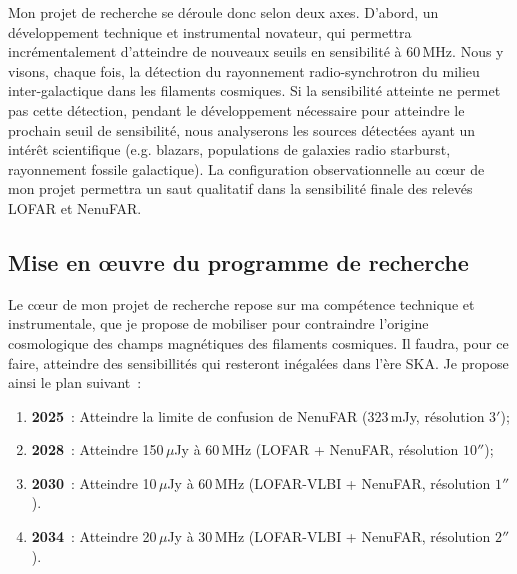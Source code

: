 Mon projet de recherche se d\'eroule donc selon deux axes. D'abord, un d\'eveloppement technique et instrumental novateur, qui permettra incr\'ementalement d'atteindre de nouveaux seuils en sensibilit\'e \`a 60\,MHz. Nous y visons, chaque fois, la d\'etection du rayonnement radio-synchrotron du milieu inter-galactique dans les filaments cosmiques. Si la sensibilit\'e atteinte ne permet pas cette d\'etection, pendant le d\'eveloppement n\'ecessaire pour atteindre le prochain seuil de sensibilit\'e, nous analyserons les sources d\'etect\'ees ayant un int\'er\^et scientifique (e.g. blazars, populations de galaxies radio starburst, rayonnement fossile galactique).
La configuration observationnelle au c{\oe}ur de mon projet permettra un saut qualitatif dans la sensibilit\'e finale des relev\'es LOFAR et NenuFAR.

\newpage

\subsection{Mise en {\oe}uvre du programme de recherche}

\pg
Le c{\oe}ur de mon projet de recherche repose sur ma comp\'etence technique et instrumentale, que je propose de mobiliser pour contraindre l'origine cosmologique des champs magn\'etiques des filaments cosmiques. 
Il faudra, pour ce faire, atteindre des sensibillit\'es qui resteront in\'egal\'ees dans l'\`ere SKA. Je propose ainsi le plan suivant~:

\begin{tcolorbox}[colback=green!10, colframe=green!50!black, arc=3mm, boxrule=1pt]
\begin{enumerate}
	\item \textbf{2025}~: Atteindre la limite de confusion de NenuFAR (323\,mJy, r\'esolution $3'$);
	\item \textbf{2028}~: Atteindre 150\,$\mu$Jy \`a 60\,MHz (LOFAR + NenuFAR, r\'esolution $10''$);
	\item \textbf{2030}~: Atteindre 10\,$\mu$Jy \`a 60\,MHz (LOFAR-VLBI + NenuFAR, r\'esolution $1''$).
	\item \textbf{2034}~: Atteindre 20\,$\mu$Jy \`a 30\,MHz (LOFAR-VLBI + NenuFAR, r\'esolution $2''$).
\end{enumerate}
\end{tcolorbox}

